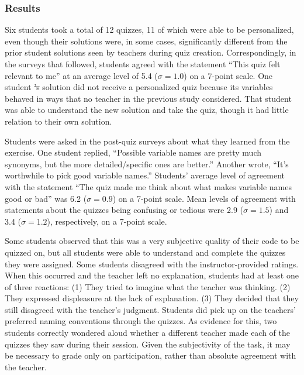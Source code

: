 \documentclass[12pt,twoside]{mitthesis}
\providecommand{\DIFdeltex}[1]{{\protect\color{red}\sout{#1}}}                      %
\providecommand{\DIFdelbegin}{} %
\providecommand{\DIFdelend}{} %
\providecommand{\DIFdel}[1]{\texorpdfstring{\DIFdeltex{#1}}{}} %
\begin{document}
{{{{{{{{{{\subsubsection{Results}
\DIFdelbegin %

\DIFdelend %
Six students took a total of 12 quizzes, 11 of which were able to be personalized, even though their solutions were, in some cases, significantly different from the prior student solutions seen by teachers during quiz creation. Correspondingly, in the surveys that followed, students agreed with the statement ``This quiz felt relevant to me'' at an average level of 5.4 ($\sigma = 1.0$) on a 7-point scale. One student \DIFdelbegin \DIFdel{'s }\DIFdelend solution did not receive a personalized quiz because its variables behaved in ways that no teacher in the previous study considered. That student was able to understand the new solution and take the quiz, though it had little relation to their own solution.

Students were asked in the post-quiz surveys about what they learned from the exercise. One student replied, ``Possible variable names are pretty much synonyms, but the more detailed/specific ones are better.'' Another wrote, ``It's worthwhile to pick good variable names.'' Students' average level of agreement with the statement ``The quiz made me think about what makes variable names good or bad'' was 6.2 ($\sigma = 0.9$) on a 7-point scale. Mean levels of agreement with statements about the quizzes being confusing or tedious were 2.9 ($\sigma = 1.5$) and 3.4 ($\sigma = 1.2$), respectively, on a 7-point scale.

Some students observed that this was a very subjective quality of their code to be quizzed on, but all students were able to understand and complete the quizzes they were assigned. Some students disagreed with the instructor-provided ratings. When this occurred and the teacher left no explanation, students had at least one of three reactions: (1) They tried to imagine what the teacher was thinking. (2) They expressed displeasure at the lack of explanation. (3) They decided that they still disagreed with the teacher's judgment. Students did pick up on the teachers' preferred naming conventions through the quizzes. As evidence for this, two students correctly wondered aloud whether a different teacher made each of the quizzes they saw during their session. Given the subjectivity of the task, it may be necessary to grade only on participation, rather than absolute agreement with the teacher.

}}}}}}}}}}
\end{document}
